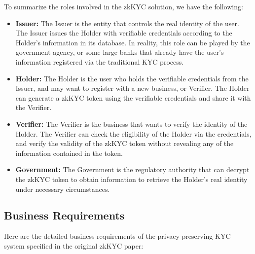 \documentclass[
]{report}
\providecommand{\tightlist}{%
  \setlength{\itemsep}{0pt}\setlength{\parskip}{0pt}}
\begin{document}
To summarize the roles involved in the zkKYC solution, we have the
following:
\begin{itemize}
\tightlist
\item
\textbf{Issuer:} The Issuer is the entity that controls the real
identity of the user. The Issuer issues the Holder with verifiable 
credentials according to the Holder's information in its database.
In reality, this role can be played by the government agency, or some
large banks that already have the user's information registered via
the traditional KYC process.

\item
\textbf{Holder:} The Holder is the user who holds the verifiable
credentials from the Issuer, and may want to register with a new
business, or Verifier. The Holder can generate a zkKYC token using the
verifiable credentials and share it with the Verifier.

\item
\textbf{Verifier:} The Verifier is the business that wants to verify
the identity of the Holder. The Verifier can check the eligibility
of the Holder via the credentials, and verify the validity of the
zkKYC token without revealing any of the information contained in the
token.

\item
\textbf{Government:} The Government is the regulatory authority that
can decrypt the zkKYC token to obtain information to retrieve the
Holder's real identity under necessary circumstances.
\end{itemize}

\subsection*{Business Requirements}

Here are the detailed business requirements of the privacy-preserving KYC
system specified in the original zkKYC paper:
\end{document}
